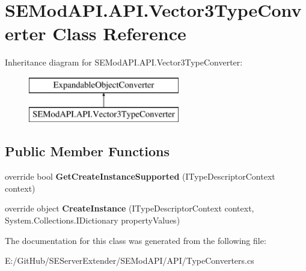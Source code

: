 \hypertarget{class_s_e_mod_a_p_i_1_1_a_p_i_1_1_vector3_type_converter}{}\section{S\+E\+Mod\+A\+P\+I.\+A\+P\+I.\+Vector3\+Type\+Converter Class Reference}
\label{class_s_e_mod_a_p_i_1_1_a_p_i_1_1_vector3_type_converter}
Inheritance diagram for S\+E\+Mod\+A\+P\+I.\+A\+P\+I.\+Vector3\+Type\+Converter\+:\begin{figure}[H]
\begin{center}
\leavevmode
\includegraphics[height=2.000000cm]{class_s_e_mod_a_p_i_1_1_a_p_i_1_1_vector3_type_converter}
\end{center}
\end{figure}
\subsection*{Public Member Functions}
\begin{DoxyCompactItemize}
\item 
\hypertarget{class_s_e_mod_a_p_i_1_1_a_p_i_1_1_vector3_type_converter_a5d966bbd9cfe54ebc73f24f6e8f858cf}{}override bool {\bfseries Get\+Create\+Instance\+Supported} (I\+Type\+Descriptor\+Context context)\label{class_s_e_mod_a_p_i_1_1_a_p_i_1_1_vector3_type_converter_a5d966bbd9cfe54ebc73f24f6e8f858cf}

\item 
\hypertarget{class_s_e_mod_a_p_i_1_1_a_p_i_1_1_vector3_type_converter_af0a4303529e02ab767ee3d1bfaa9282d}{}override object {\bfseries Create\+Instance} (I\+Type\+Descriptor\+Context context, System.\+Collections.\+I\+Dictionary property\+Values)\label{class_s_e_mod_a_p_i_1_1_a_p_i_1_1_vector3_type_converter_af0a4303529e02ab767ee3d1bfaa9282d}

\end{DoxyCompactItemize}


The documentation for this class was generated from the following file\+:\begin{DoxyCompactItemize}
\item 
E\+:/\+Git\+Hub/\+S\+E\+Server\+Extender/\+S\+E\+Mod\+A\+P\+I/\+A\+P\+I/Type\+Converters.\+cs\end{DoxyCompactItemize}
